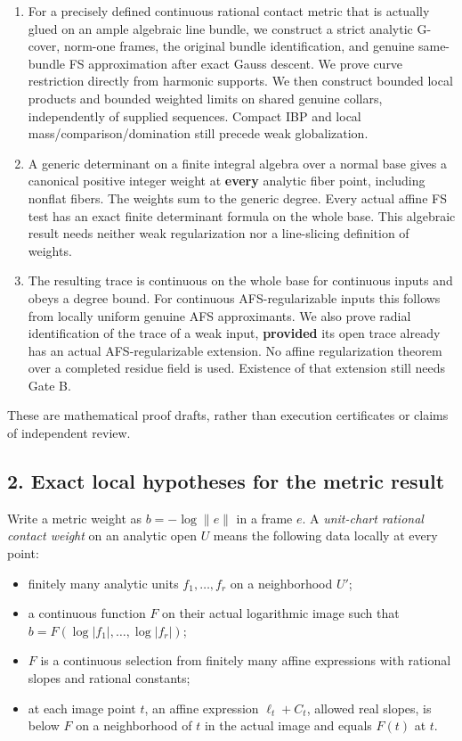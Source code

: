 \documentclass[
  10pt,
]{article}
\providecommand{\tightlist}{%
  \setlength{\itemsep}{0pt}\setlength{\parskip}{0pt}}
\begin{document}
\begin{enumerate}
\def\labelenumi{\arabic{enumi}.}
\tightlist
\item
  For a precisely defined continuous rational contact metric that is
  actually glued on an ample algebraic line bundle, we construct a
  strict analytic G-cover, norm-one frames, the original bundle
  identification, and genuine same-bundle FS approximation after exact
  Gauss descent. We prove curve restriction directly from harmonic
  supports. We then construct bounded local products and bounded
  weighted limits on shared genuine collars, independently of supplied
  sequences. Compact IBP and local mass/comparison/domination still
  precede weak globalization.
\item
  A generic determinant on a finite integral algebra over a normal base
  gives a canonical positive integer weight at \textbf{every} analytic
  fiber point, including nonflat fibers. The weights sum to the generic
  degree. Every actual affine FS test has an exact finite determinant
  formula on the whole base. This algebraic result needs neither weak
  regularization nor a line-slicing definition of weights.
\item
  The resulting trace is continuous on the whole base for continuous
  inputs and obeys a degree bound. For continuous AFS-regularizable
  inputs this follows from locally uniform genuine AFS approximants. We
  also prove radial identification of the trace of a weak input,
  \textbf{provided} its open trace already has an actual
  AFS-regularizable extension. No affine regularization theorem over a
  completed residue field is used. Existence of that extension still
  needs Gate B.
\end{enumerate}

These are mathematical proof drafts, rather than execution certificates
or claims of independent review.

\subsection{2. Exact local hypotheses for the metric
result}\label{exact-local-hypotheses-for-the-metric-result}

Write a metric weight as \(b=-\log\|e\|\) in a frame \(e\). A
\emph{unit-chart rational contact weight} on an analytic open \(U\)
means the following data locally at every point:

\begin{itemize}
\tightlist
\item
  finitely many analytic units \(f_1,\ldots,f_r\) on a neighborhood
  \(U'\);
\item
  a continuous function \(F\) on their actual logarithmic image such
  that \(b=F(\log|f_1|,\ldots,\log|f_r|)\);
\item
  \(F\) is a continuous selection from finitely many affine expressions
  with rational slopes and rational constants;
\item
  at each image point \(t\), an affine expression \(\ell_t+C_t\),
  allowed real slopes, is below \(F\) on a neighborhood of \(t\) in the
  actual image and equals \(F(t)\) at \(t\).
\end{itemize}
\end{document}
